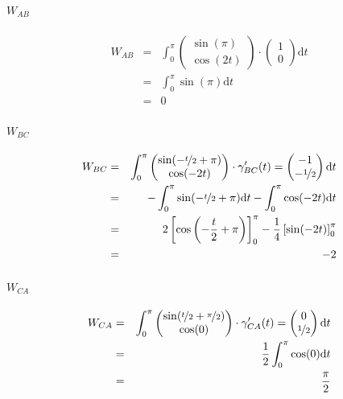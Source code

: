 \documentclass[a4paper, 11pt]{report} %
\newcommand{\dt}{\mathrm{d}t}
\begin{document}
\paragraph{$W_{AB}$}

\begin{eqnarray*}
W_{AB} & = &
\int_0^\pi
\begin{pmatrix}
\sin(\pi)\\
\cos(2t)
\end{pmatrix}
\cdot
\begin{pmatrix}
1\\
0
\end{pmatrix}
\dt\\
& = & \int_0^\pi\sin(\pi)\dt\\
& = & 0
\end{eqnarray*}

\paragraph{$W_{BC}$}

\begin{eqnarray*}
W_{BC} & = &
\int_0^\pi
\begin{pmatrix}
\sin(-\nicefrac{t}{2}+\pi)\\
\cos(-2t)
\end{pmatrix} 
\cdot
\gamma'_{BC}(t) =
\begin{pmatrix}
-1\\
-\nicefrac{1}{2}
\end{pmatrix}
\dt\\
& = & -\int_0^\pi\sin(-\nicefrac{t}{2}+\pi)\dt-\int_0^\pi\cos(-2t)\dt\\
& = & 2\left[\cos\left(-\frac{t}{2}+\pi\right)\right]_0^\pi - \frac{1}{4}\left[\sin(-2t)\right]_0^\pi\\
& = & -2
\end{eqnarray*}

\paragraph{$W_{CA}$}

\begin{eqnarray*}
W_{CA} & = &
\int_0^\pi
\begin{pmatrix}
\sin(\nicefrac{t}{2} +\nicefrac{\pi}{2})\\
\cos(0)
\end{pmatrix}
\cdot
\gamma'_{CA}(t) =
\begin{pmatrix}
0\\
\nicefrac{1}{2}
\end{pmatrix}
\dt\\
& = & \frac{1}{2}\int_0^\pi\cos(0)\dt\\
& = & \frac{\pi}{2}
\end{eqnarray*}
\end{document}

